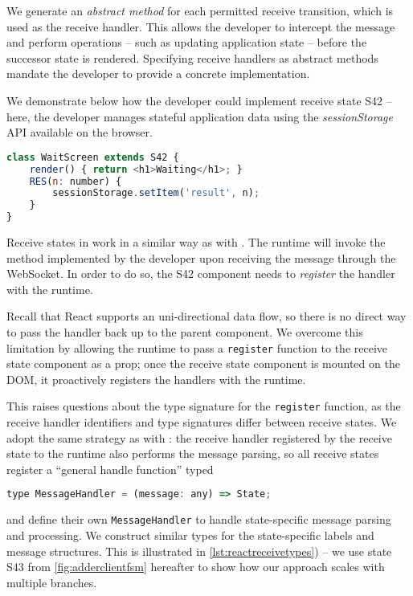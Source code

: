 We generate an \textit{abstract method} 
for each permitted receive
transition, which is used as the receive handler.
This allows the developer to intercept the
message and perform operations -- such as updating
application state -- before the successor state is rendered.
Specifying receive handlers as abstract methods mandate
the developer to provide a concrete implementation.

We demonstrate below how the developer could implement
receive state S42 -- here, the developer manages
stateful application data using the
\textit{sessionStorage} API \cite{SessionStorage}
available on the browser.

\begin{lstlisting}[language=javascript]
class WaitScreen extends S42 {
	render() { return <h1>Waiting</h1>; }
	RES(n: number) {
		sessionStorage.setItem('result', n);
	}
}
\end{lstlisting}

Receive states in \reactcodegen
work in a similar way as with \nodecodegen.
The runtime will invoke the  method
implemented by the developer upon receiving the message
through the WebSocket.
In order to do so, the S42 component 
needs to \textit{register}
the handler with the runtime.

Recall that React supports an uni-directional data flow,
so there is no direct way to pass the handler
back up to the parent component.
We overcome this limitation by allowing the
runtime to pass a \texttt{register} function to the
receive state component as a prop; once the receive state
component is mounted on the DOM, it proactively 
registers the handlers with the runtime.

This raises questions about the type signature for the
\texttt{register} function, as the receive handler
identifiers and type signatures differ between receive states.
We adopt the same strategy as with \nodecodegen:
the receive handler registered by the receive state
to the runtime also performs the message parsing,
so all receive states register a ``general handle function'' typed

\begin{lstlisting}[language=javascript,numbers=none]
type MessageHandler = (message: any) => State;
\end{lstlisting}

and define their own \texttt{MessageHandler} to handle
state-specific message parsing and processing.
We construct similar types for the state-specific
labels and message structures.
This is illustrated in \cref{lst:reactreceivetypes}) --
we use state S43 from \cref{fig:adderclientfsm} hereafter
to show how our approach scales with multiple branches.

